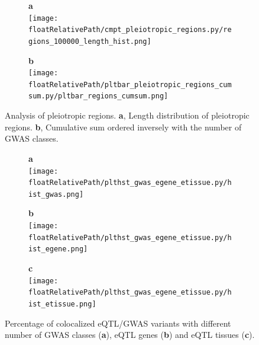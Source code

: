%
\begin{figure}[!tbp]
\centering
%
\begin{subfigure}[]{.33\textwidth}
\textbf{a}
\\
\texttt{[image: \\floatRelativePath/cmpt\_pleiotropic\_regions.py/regions\_100000\_length\_hist.png]}
\end{subfigure}
%
\begin{subfigure}[]{.33\textwidth}
\textbf{b}
\\
\texttt{[image: \\floatRelativePath/pltbar\_pleiotropic\_regions\_cumsum.py/pltbar\_regions\_cumsum.png]}
\end{subfigure}
%
\caption{Analysis of pleiotropic regions. \textbf{a}, Length distribution of pleiotropic regions. \textbf{b}, Cumulative sum ordered inversely with the number of GWAS classes.} \label{fig:pleiotropy_region_distribution}
\end{figure}
%
%
\begin{figure}[!tbp]
\centering
%
\begin{subfigure}[]{.32\textwidth}
\textbf{a}
\\
\texttt{[image: \\floatRelativePath/plthst\_gwas\_egene\_etissue.py/hist\_gwas.png]}
\end{subfigure}
%
\begin{subfigure}[]{.32\textwidth}
\textbf{b}
\\
\texttt{[image: \\floatRelativePath/plthst\_gwas\_egene\_etissue.py/hist\_egene.png]}
\end{subfigure}
%
\begin{subfigure}[]{.32\textwidth}
\textbf{c}
\\
\texttt{[image: \\floatRelativePath/plthst\_gwas\_egene\_etissue.py/hist\_etissue.png]}
\end{subfigure}
%
\caption{Percentage of colocalized eQTL/GWAS variants with different number of GWAS classes (\textbf{a}), eQTL genes
    (\textbf{b}) and eQTL tissues (\textbf{c}).} \label{fig:hist_gwas_egene_etissue}
\end{figure}

